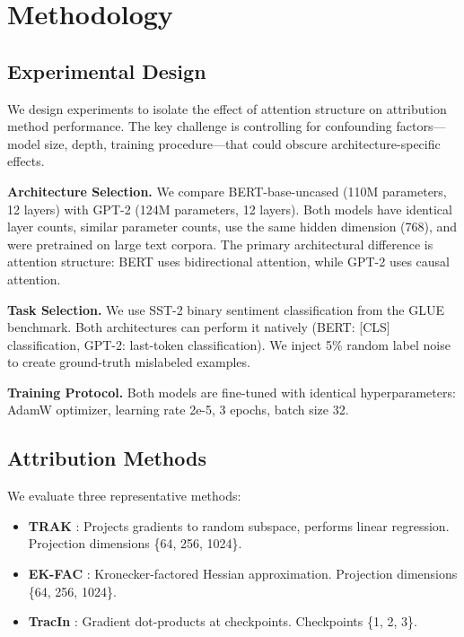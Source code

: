 \section{Methodology}

\subsection{Experimental Design}

We design experiments to isolate the effect of attention structure on attribution method performance. The key challenge is controlling for confounding factors---model size, depth, training procedure---that could obscure architecture-specific effects.

\textbf{Architecture Selection.} We compare BERT-base-uncased (110M parameters, 12 layers) with GPT-2 (124M parameters, 12 layers). Both models have identical layer counts, similar parameter counts, use the same hidden dimension (768), and were pretrained on large text corpora. The primary architectural difference is attention structure: BERT uses bidirectional attention, while GPT-2 uses causal attention.

\textbf{Task Selection.} We use SST-2 binary sentiment classification from the GLUE benchmark. Both architectures can perform it natively (BERT: [CLS] classification, GPT-2: last-token classification). We inject 5\% random label noise to create ground-truth mislabeled examples.

\textbf{Training Protocol.} Both models are fine-tuned with identical hyperparameters: AdamW optimizer, learning rate 2e-5, 3 epochs, batch size 32.

\subsection{Attribution Methods}

We evaluate three representative methods:

\begin{itemize}
    \item \textbf{TRAK} \citep{park2023trak}: Projects gradients to random subspace, performs linear regression. Projection dimensions \{64, 256, 1024\}.
    \item \textbf{EK-FAC} \citep{grosse2023studying}: Kronecker-factored Hessian approximation. Projection dimensions \{64, 256, 1024\}.
    \item \textbf{TracIn} \citep{pruthi2020estimating}: Gradient dot-products at checkpoints. Checkpoints \{1, 2, 3\}.
\end{itemize}

